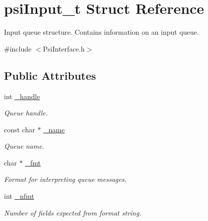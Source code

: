 \hypertarget{structpsiInput__t}{}\section{psi\+Input\+\_\+t Struct Reference}
\label{structpsiInput__t}


Input queue structure. Contains information on an input queue.  




{\ttfamily \#include $<$Psi\+Interface.\+h$>$}

\subsection*{Public Attributes}
\begin{DoxyCompactItemize}
\item 
\mbox{\label{structpsiInput__t_a21f6897a7e84d4e62099293203c08225}} 
int \hyperlink{structpsiInput__t_a21f6897a7e84d4e62099293203c08225}{\+\_\+handle}
\begin{DoxyCompactList}\small\item\em Queue handle. \end{DoxyCompactList}\item 
\mbox{\label{structpsiInput__t_af043731e8bd403a4b6daa6d2dfc0bfbb}} 
const char $\ast$ \hyperlink{structpsiInput__t_af043731e8bd403a4b6daa6d2dfc0bfbb}{\+\_\+name}
\begin{DoxyCompactList}\small\item\em Queue name. \end{DoxyCompactList}\item 
\mbox{\label{structpsiInput__t_a4b30391a07118d0fc50315750a04f3fc}} 
char $\ast$ \hyperlink{structpsiInput__t_a4b30391a07118d0fc50315750a04f3fc}{\+\_\+fmt}
\begin{DoxyCompactList}\small\item\em Format for interpreting queue messages. \end{DoxyCompactList}\item 
\mbox{\label{structpsiInput__t_a9496391ef31330ad5ea299c578f60be1}} 
int \hyperlink{structpsiInput__t_a9496391ef31330ad5ea299c578f60be1}{\+\_\+nfmt}
\begin{DoxyCompactList}\small\item\em Number of fields expected from format string. \end{DoxyCompactList}\end{DoxyCompactItemize}


